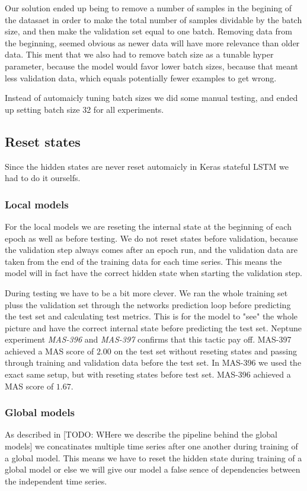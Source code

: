 Our solution ended up being to remove a number of samples in the begining of
the datasaet in order to make the total number of samples dividable by the batch size,
and then make the validation set equal to one batch. Removing data from the beginning,
seemed obvious as newer data will have more relevance than older data.
This ment that we also had to remove batch size as a tunable hyper parameter,
because the model would favor lower batch sizes, because that meant less validation data,
which equals potentially fewer examples to get wrong.

Instead of automaicly tuning batch sizes we did some manual testing, and
ended up setting batch size 32 for all experiments.


\subsection*{Reset states}
Since  the hidden states are never reset automaicly in Keras stateful LSTM
we had to do it ourselfs.

\subsubsection{Local models}
For the local models we are reseting the internal state at the beginning
of each epoch as well as before testing. We do not reset states before validation,
because the validation step always comes after an epoch run, and the
validation data are taken from the end of the training data for each time series.
This means the model will in fact have the correct hidden state when starting the validation step.

During testing we have to be a bit more clever. We ran the whole training set pluss
the validation set through the networks prediction loop before predicting the test
set and calculating test metrics.
This is for the model to "see" the whole picture and have the correct
internal state before predicting the test set.
Neptune experiment \textit{MAS-396} and \textit{MAS-397} confirms
that this tactic pay off. MAS-397 achieved a MAS score of $2.00$ on the test set
without reseting states and passing through training and validation data before
the test set. In MAS-396 we used the exact same setup, but with reseting states
before test set. MAS-396 achieved a MAS score of $1.67$.

\subsubsection{Global models}
As described in [TODO: WHere we describe the pipeline behind the global models]
we concatinates multiple time series after one another during training of a global model.
This means we have to reset the hidden state during training of a global model
or else we will give our model a false sence of dependencies between
the independent time series.

